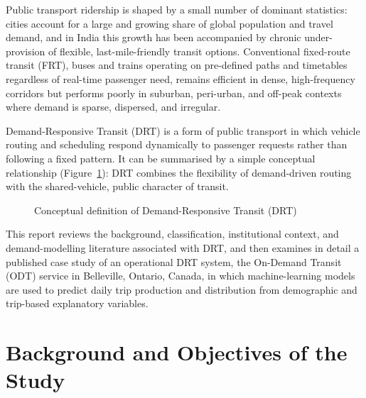 \documentclass[12pt]{article}
\begin{document}
Public transport ridership is shaped by a small number of dominant statistics: cities
account for a large and growing share of global population and travel demand, and in
India this growth has been accompanied by chronic under-provision of flexible,
last-mile-friendly transit options. Conventional fixed-route transit (FRT), buses
and trains operating on pre-defined paths and timetables regardless of
real-time passenger need, remains efficient in dense, high-frequency corridors but
performs poorly in suburban, peri-urban, and off-peak contexts where demand is
sparse, dispersed, and irregular.

Demand-Responsive Transit (DRT) is a form of public transport in which vehicle
routing and scheduling respond dynamically to passenger requests rather than
following a fixed pattern. It can be summarised by a simple conceptual relationship
(Figure~\ref{fig:drt-eq}): DRT combines the flexibility of demand-driven routing with
the shared-vehicle, public character of transit.

\begin{figure}[H]
\centering
{}
\caption{Conceptual definition of Demand-Responsive Transit (DRT)}
\label{fig:drt-eq}
\end{figure}

This report reviews the background, classification, institutional context, and
demand-modelling literature associated with DRT, and then examines in detail a
published case study of an operational DRT system, the On-Demand Transit (ODT)
service in Belleville, Ontario, Canada, in which machine-learning models are used to
predict daily trip production and distribution from demographic and trip-based
explanatory variables.

\section{Background and Objectives of the Study}
\end{document}

